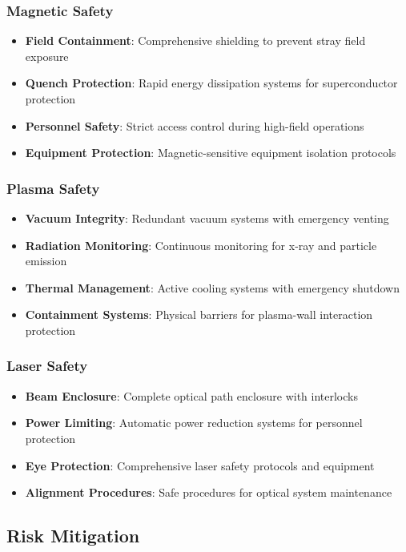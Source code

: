 \documentclass[10pt,twocolumn]{article}
\begin{document}
\subsubsection{Magnetic Safety}
\begin{itemize}
\item \textbf{Field Containment}: Comprehensive shielding to prevent stray field exposure
\item \textbf{Quench Protection}: Rapid energy dissipation systems for superconductor protection
\item \textbf{Personnel Safety}: Strict access control during high-field operations
\item \textbf{Equipment Protection}: Magnetic-sensitive equipment isolation protocols
\end{itemize}

\subsubsection{Plasma Safety}
\begin{itemize}
\item \textbf{Vacuum Integrity}: Redundant vacuum systems with emergency venting
\item \textbf{Radiation Monitoring}: Continuous monitoring for x-ray and particle emission
\item \textbf{Thermal Management}: Active cooling systems with emergency shutdown
\item \textbf{Containment Systems}: Physical barriers for plasma-wall interaction protection
\end{itemize}

\subsubsection{Laser Safety}
\begin{itemize}
\item \textbf{Beam Enclosure}: Complete optical path enclosure with interlocks
\item \textbf{Power Limiting}: Automatic power reduction systems for personnel protection
\item \textbf{Eye Protection}: Comprehensive laser safety protocols and equipment
\item \textbf{Alignment Procedures}: Safe procedures for optical system maintenance
\end{itemize}

\subsection{Risk Mitigation}
\end{document}
